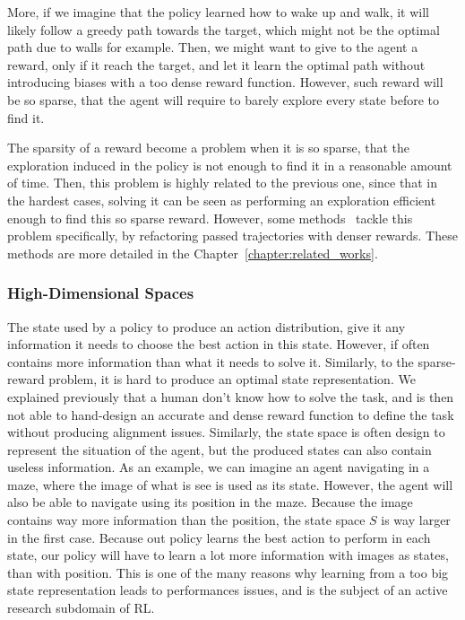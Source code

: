 More, if we imagine that the policy learned how to wake up and walk, it will likely follow a greedy path towards the
target, which might not be the optimal path due to walls for example.
Then, we might want to give to the agent a reward, only if it reach the target, and let it learn the optimal path
without introducing biases with a too dense reward function.
However, such reward will be so sparse, that the agent will require to barely explore every state before to find it.

The sparsity of a reward become a problem when it is so sparse, that the exploration induced in the policy is not
enough to find it in a reasonable amount of time.
Then, this problem is highly related to the previous one, since that in the hardest cases, solving it can be seen as
performing an exploration efficient enough to find this so sparse reward.
However, some methods~\citep{andrychowicz2017hindsight, levy2019learning} tackle this problem specifically, by
refactoring passed trajectories with denser rewards.
These methods are more detailed in the Chapter~\ref{chapter:related_works}.

\subsubsection{High-Dimensional Spaces}\label{subsubsection:bg:rl:prblems:high-dimentions}

The state used by a policy to produce an action distribution, give it any information it needs to choose the best action
in this state.
However, if often contains more information than what it needs to solve it.
Similarly, to the sparse-reward problem, it is hard to produce an optimal state representation.
We explained previously that a human don't know how to solve the task, and is then not able to hand-design an accurate
and dense reward function to define the task without producing alignment issues.
Similarly, the state space is often design to represent the situation of the agent, but the produced states can also
contain useless information.
As an example, we can imagine an agent navigating in a maze, where the image of what is see is used as its state.
However, the agent will also be able to navigate using its position in the maze.
Because the image contains way more information than the position, the state space $S$ is way larger in the first case.
Because out policy learns the best action to perform in each state, our policy will have to learn a lot more information
with images as states, than with position.
This is one of the many reasons why learning from a too big state representation leads to performances issues, and is
the subject of an active research subdomain of RL\@.

